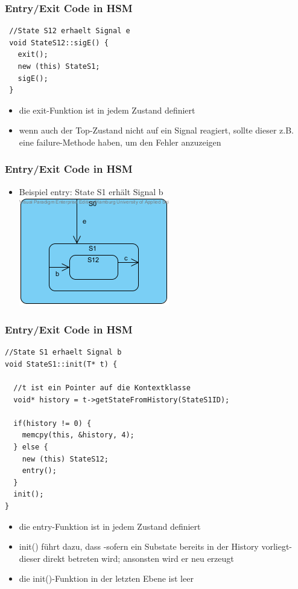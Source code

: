 \documentclass{beamer}
\begin{document}
\begin{frame}[fragile]
 \frametitle{Entry/Exit Code in HSM }
 \begin{lstlisting}
 //State S12 erhaelt Signal e
 void StateS12::sigE() {
   exit();
   new (this) StateS1;
   sigE();
 }
 \end{lstlisting}
 \begin{itemize}
  \item die exit-Funktion ist in jedem Zustand definiert
  \item wenn auch der Top-Zustand nicht auf ein Signal reagiert, sollte dieser z.B. eine
  failure-Methode haben, um den Fehler anzuzeigen
 \end{itemize}
\end{frame}

\begin{frame}
 \frametitle{Entry/Exit Code in HSM  }
 \begin{itemize}
  \item Beispiel entry: State S1 erh\"alt Signal b\newline\newline
  \includegraphics[scale=.8]{img/beispiel_exitSM}
 \end{itemize}
\end{frame}

\begin{frame}[fragile]
 \frametitle{Entry/Exit Code in HSM }
 \begin{lstlisting}
//State S1 erhaelt Signal b
void StateS1::init(T* t) {

  //t ist ein Pointer auf die Kontextklasse
  void* history = t->getStateFromHistory(StateS1ID);

  if(history != 0) {
    memcpy(this, &history, 4);
  } else {
    new (this) StateS12;
    entry();
  }
  init();
}
 \end{lstlisting}
\end{frame}

\begin{frame}[fragile]
 \begin{itemize}
  \item die entry-Funktion ist in jedem Zustand definiert
  \item init() f\"uhrt dazu, dass -sofern ein Substate bereits in der History vorliegt- dieser direkt betreten wird; ansonsten wird er neu erzeugt
  \item die init()-Funktion in der letzten Ebene ist leer
 \end{itemize}
\end{frame}
\end{document}
